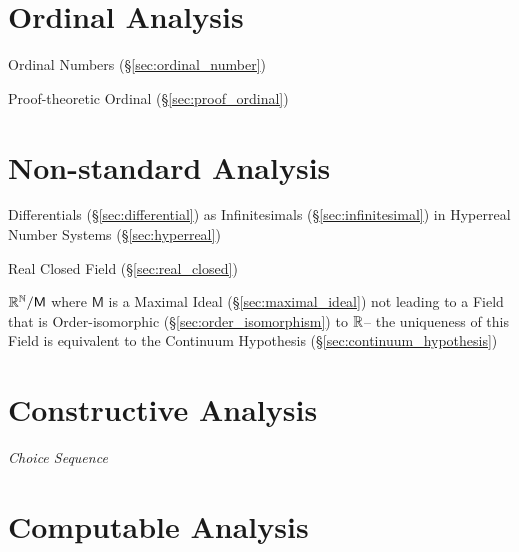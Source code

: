 \section{Ordinal Analysis}\label{sec:ordinal_analysis}

Ordinal Numbers (\S\ref{sec:ordinal_number})

Proof-theoretic Ordinal (\S\ref{sec:proof_ordinal})



\section{Non-standard Analysis}\label{sec:nonstandard_analysis}

Differentials (\S\ref{sec:differential}) as Infinitesimals
(\S\ref{sec:infinitesimal}) in Hyperreal Number Systems (\S\ref{sec:hyperreal})

Real Closed Field (\S\ref{sec:real_closed})

$\mathbb{R}^{\mathbb{N}} / \mathsf{M}$ where $\mathsf{M}$ is a Maximal Ideal
(\S\ref{sec:maximal_ideal}) not leading to a Field that is
Order-isomorphic (\S\ref{sec:order_isomorphism}) to $\mathbb{R}$-- the
uniqueness of this Field is equivalent to the Continuum Hypothesis
(\S\ref{sec:continuum_hypothesis})



\section{Constructive Analysis}\label{sec:constructive_analysis}

\emph{Choice Sequence}



\section{Computable Analysis}\label{sec:computable_analysis}

